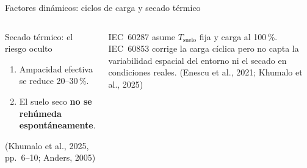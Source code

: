 \documentclass[aspectratio=169]{beamer}
\newcommand{\refcite}[1]{{\footnotesize\color{gray!70!black} #1}}
\begin{document}
\begin{frame}{Factores dinámicos: ciclos de carga y secado térmico}
\begin{columns}[T]
\begin{alertblock}{\small Secado térmico: el riesgo oculto}
\begin{enumerate}[leftmargin=*,itemsep=0pt]
    \item Ampacidad efectiva se reduce 20--30\,\%.
    \item El suelo seco \textbf{no se rehúmeda espontáneamente}.
\end{enumerate}
\refcite{(Khumalo et al., 2025, pp.~6--10; Anders, 2005)}
\end{alertblock}
\vspace{0.15em}
\begin{exampleblock}{}\scriptsize
IEC~60287 asume $T_\text{suelo}$ fija y carga al 100\,\%.
IEC~60853 corrige la carga cíclica pero no capta la variabilidad
espacial del entorno ni el secado en condiciones reales.
\refcite{(Enescu et al., 2021; Khumalo et al., 2025)}
\end{exampleblock}
\end{columns}
\end{frame}
\end{document}
